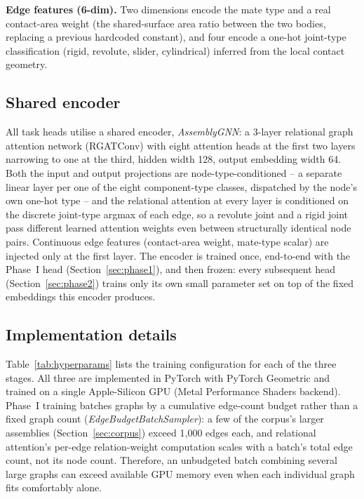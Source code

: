 \documentclass[sn-mathphys,Numbered]{sn-jnl}
\begin{document}
\textbf{Edge features (6-dim).} Two dimensions encode the mate type and a real contact-area weight (the shared-surface area ratio between the two bodies, replacing a previous hardcoded constant), and four encode a one-hot joint-type classification (rigid, revolute, slider, cylindrical) inferred from the local contact geometry.

\subsection{Shared encoder}\label{sec:encoder}

All task heads utilise a shared encoder, \textit{AssemblyGNN}: a 3-layer relational graph attention network (RGATConv) with eight attention heads at the first two layers narrowing to one at the third, hidden width 128, output embedding width 64. Both the input and output projections are node-type-conditioned -- a separate linear layer per one of the eight component-type classes, dispatched by the node's own one-hot type -- and the relational attention at every layer is conditioned on the discrete joint-type argmax of each edge, so a revolute joint and a rigid joint pass different learned attention weights even between structurally identical node pairs. Continuous edge features (contact-area weight, mate-type scalar) are injected only at the first layer. The encoder is trained once, end-to-end with the Phase~I head (Section~\ref{sec:phase1}), and then frozen: every subsequent head (Section~\ref{sec:phase2}) trains only its own small parameter set on top of the fixed embeddings this encoder produces.

\subsection{Implementation details}\label{sec:implementation}

Table~\ref{tab:hyperparams} lists the training configuration for each of the three stages. All three are implemented in PyTorch with PyTorch Geometric \cite{fey2019pyg} and trained on a single Apple-Silicon GPU (Metal Performance Shaders backend). Phase~I training batches graphs by a cumulative edge-count budget rather than a fixed graph count (\textit{EdgeBudgetBatchSampler}): a few of the corpus's larger assemblies (Section~\ref{sec:corpus}) exceed 1{,}000 edges each, and relational attention's per-edge relation-weight computation scales with a batch's total edge count, not its node count. Therefore, an unbudgeted batch combining several large graphs can exceed available GPU memory even when each individual graph fits comfortably alone.
\end{document}
